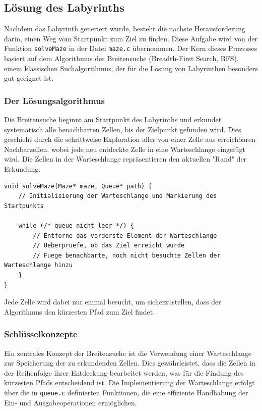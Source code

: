 \subsection{Lösung des Labyrinths}

Nachdem das Labyrinth generiert wurde, besteht die nächste Herausforderung darin, einen Weg vom Startpunkt zum Ziel zu finden. Diese Aufgabe wird von der Funktion \texttt{solveMaze} in der Datei \texttt{maze.c} übernommen. Der Kern dieses Prozesses basiert auf dem Algorithmus der Breitensuche (Breadth-First Search, BFS), einem klassischen Suchalgorithmus, der für die Lösung von Labyrinthen besonders gut geeignet ist.

\subsubsection{Der Lösungsalgorithmus}

Die Breitensuche beginnt am Startpunkt des Labyrinths und erkundet systematisch alle benachbarten Zellen, bis der Zielpunkt gefunden wird. Dies geschieht durch die schrittweise Exploration aller von einer Zelle aus erreichbaren Nachbarzellen, wobei jede neu entdeckte Zelle in eine Warteschlange eingefügt wird. Die Zellen in der Warteschlange repräsentieren den aktuellen "Rand" der Erkundung. 

\begin{lstlisting}[style=CStyle]
void solveMaze(Maze* maze, Queue* path) {
    // Initialisierung der Warteschlange und Markierung des Startpunkts
    
    while (/* queue nicht leer */) {
        // Entferne das vorderste Element der Warteschlange
        // Ueberpruefe, ob das Ziel erreicht wurde
        // Fuege benachbarte, noch nicht besuchte Zellen der Warteschlange hinzu
    }
}
\end{lstlisting}

Jede Zelle wird dabei nur einmal besucht, um sicherzustellen, dass der Algorithmus den kürzesten Pfad zum Ziel findet.

\subsubsection{Schlüsselkonzepte}

Ein zentrales Konzept der Breitensuche ist die Verwendung einer Warteschlange zur Speicherung der zu erkundenden Zellen. Dies gewährleistet, dass die Zellen in der Reihenfolge ihrer Entdeckung bearbeitet werden, was für die Findung des kürzesten Pfads entscheidend ist. Die Implementierung der Warteschlange erfolgt über die in \texttt{queue.c} definierten Funktionen, die eine effiziente Handhabung der Ein- und Ausgabeoperationen ermöglichen.

